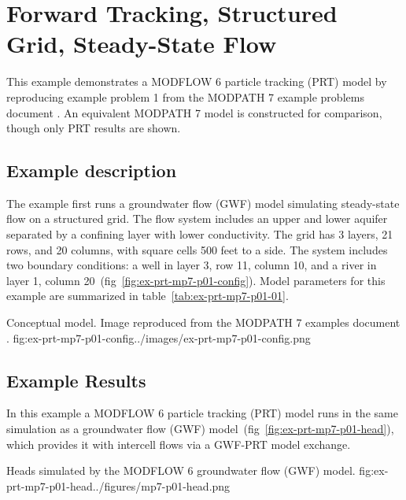 \section{Forward Tracking, Structured Grid, Steady-State Flow}

This example demonstrates a MODFLOW 6 particle tracking (PRT) model by reproducing example problem 1 from the MODPATH 7 \citep{pollock2016modpath7} example problems document \citep{modpath7examples}. An equivalent MODPATH 7 model is constructed for comparison, though only PRT results are shown.

\subsection{Example description}

The example first runs a groundwater flow (GWF) model simulating steady-state flow on a structured grid. The flow system includes an upper and lower aquifer separated by a confining layer with lower conductivity. The grid has 3 layers, 21 rows, and 20 columns, with square cells 500 feet to a side. The system includes two boundary conditions: a well in layer 3, row 11, column 10, and a river in layer 1, column 20~(fig~\ref{fig:ex-prt-mp7-p01-config}). Model parameters for this example are summarized in table~\ref{tab:ex-prt-mp7-p01-01}.

\begin{StandardFigure}{
    Conceptual model. Image reproduced from the MODPATH 7 examples document \citep{modpath7examples}.
    }{fig:ex-prt-mp7-p01-config}{../images/ex-prt-mp7-p01-config.png}
\end{StandardFigure}



\subsection{Example Results}

In this example a MODFLOW 6 particle tracking (PRT) model runs in the same simulation as a groundwater flow (GWF) model~(fig~\ref{fig:ex-prt-mp7-p01-head}), which provides it with intercell flows via a GWF-PRT model exchange.

\begin{StandardFigure}{
    Heads simulated by the MODFLOW 6 groundwater flow (GWF) model.
    }{fig:ex-prt-mp7-p01-head}{../figures/mp7-p01-head.png}
\end{StandardFigure}

